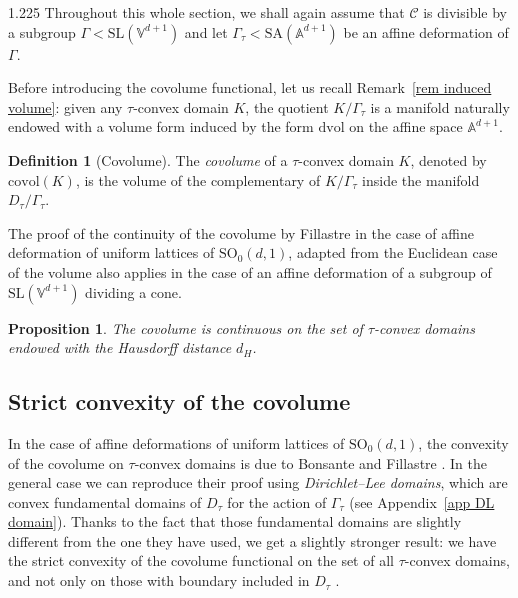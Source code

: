 \documentclass[reqno, a4paper]{amsart}
\numberwithin{equation}{section}
\numberwithin{figure}{section}
\newtheorem{proposition}[theorem]{Proposition}
\theoremstyle{definition}
\newtheorem{definition}[theorem]{Definition}
\theoremstyle{remark}
\newcommand{\V}{\mathbb{V}} %
\newcommand{\A}{\mathbb{A}} %
\newcommand{\SL}{\mathrm{SL}} %
\newcommand{\SO}{\mathrm{SO}} %
\newcommand{\SA}{\mathrm{SA}} %
\newcommand{\dif}{\mathrm{d}} %
\newcommand{\C}{\mathcal{C}} %
\newcommand{\dvol}{\dif \mathrm{vol}} %
\newcommand{\covol}{\mathrm{covol}} %
\begin{document}
\begin{spacing}{1.225}
Throughout this whole section, we shall again assume that $\C$ is divisible by a subgroup $\Gamma < \SL(\V^{d+1})$ and let $\Gamma_\tau < \SA(\A^{d+1})$ be an affine deformation of $\Gamma$.

Before introducing the covolume functional, let us recall Remark~\ref{rem induced volume}: given any $\tau$-convex domain $K$, the quotient $K/\Gamma_\tau$ is a manifold naturally endowed with a volume form induced by the form $\dvol$ on the affine space $\A^{d+1}$. 

\begin{definition}[Covolume]
The \emph{covolume} of a $\tau$-convex domain $K$, denoted by $\covol(K)$, is the volume of the complementary of $K/\Gamma_\tau$ inside the manifold $D_\tau/\Gamma_\tau$. 
\end{definition}

The proof of the continuity of the covolume by Fillastre \cite[Lemma~5.1]{Fillastre_13} in the case of affine deformation of uniform lattices of $\SO_0(d,1)$, adapted from the Euclidean case of the volume \cite[Theorem~1.8.20]{Schneider_93} also applies in the case of an affine deformation of a subgroup of $\SL(\V^{d+1})$ dividing a cone. 

\begin{proposition}
\label{prop covol is continuous}
The covolume is continuous on the set of $\tau$-convex domains endowed with the Hausdorff distance $d_H$. 
\end{proposition}

\subsection{Strict convexity of the covolume}

In the case of affine deformations of uniform lattices of $\SO_0(d,1)$, the convexity of the covolume on $\tau$-convex domains is due to Bonsante and Fillastre \cite[Theorem~1.2]{Bonsante_Fillastre_17}. In the general case we can reproduce their proof using \emph{Dirichlet--Lee domains}, which are convex fundamental domains of $D_\tau$ for the action of $\Gamma_\tau$ (see Appendix~\ref{app DL domain}). Thanks to the fact that those fundamental domains are slightly different from the one they have used, we get a slightly stronger result: we have the strict convexity of the covolume functional on the set of all $\tau$-convex domains, and not only on those with boundary included in $D_\tau$ \cite[Proposition~3.33]{Bonsante_Fillastre_17}. 


\end{spacing}
\end{document}

